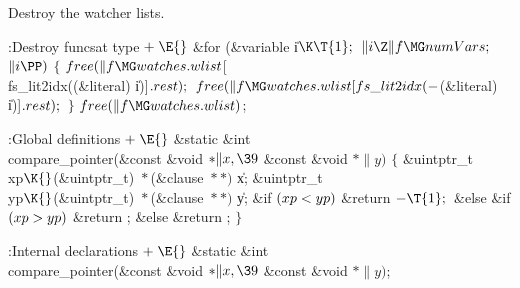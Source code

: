 Destroy the watcher lists.

\Y\B\4:Destroy funcsat type\X${}\mathrel+\E{}$\6
\&{for} (\&{variable} \|i${}\K\T{1};{}$ ${}\|i\Z\|f\MG\\{numVars};{}$ ${}\|i%
\PP){}$\5
${}\{{}$\1\6
${}\\{free}(\|f\MG\\{watches}.\\{wlist}{}$[\\{fs\_lit2idx}((\&{literal}) %
\|i)]${}.\\{rest});{}$\6
${}\\{free}(\|f\MG\\{watches}.\\{wlist}[\\{fs\_lit2idx}({-}{}$(\&{literal}) %
\|i)]${}.\\{rest});{}$\6
\4${}\}{}$\2\6
${}\\{free}(\|f\MG\\{watches}.\\{wlist}){}$;\par
\fi

\Y\B\4:Global definitions\X${}\mathrel+\E{}$\6
\&{static} \&{int} \\{compare\_pointer}(\&{const} \&{void} ${}{*}\|x,\39{}$%
\&{const} \&{void} ${}{*}\|y){}$\1\1\2\2\6
${}\{{}$\1\6
\&{uintptr\_t} \\{xp}${}\K{}$(\&{uintptr\_t}) ${}{*}{}$(\&{clause}
${}{*}{*}){}$ \|x;\6
\&{uintptr\_t} \\{yp}${}\K{}$(\&{uintptr\_t}) ${}{*}{}$(\&{clause}
${}{*}{*}){}$ \|y;\7
\&{if} ${}(\\{xp}<\\{yp}){}$\1\5
\&{return} ${}{-}\T{1};{}$\2\6
\&{else} \&{if} ${}(\\{xp}>\\{yp}){}$\1\5
\&{return} ;\2\6
\&{else}\1\5
\&{return} ;\2\6
\4${}\}{}$\2\par
\fi

\Y\B\4:Internal declarations\X${}\mathrel+\E{}$\6
\&{static} \&{int} \\{compare\_pointer}(\&{const} \&{void} ${}{*}\|x,\39{}$%
\&{const} \&{void} ${}{*}\|y){}$;\par
\fi

